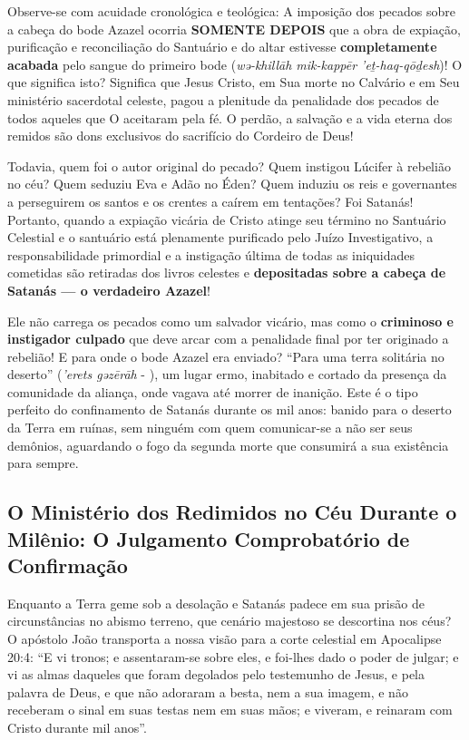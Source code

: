 \documentclass[11pt,a4paper,openany]{book}
\begin{document}
Observe-se com acuidade cronológica e teológica:
A imposição dos pecados sobre a cabeça do bode Azazel ocorria \textbf{SOMENTE DEPOIS} que a obra de expiação, purificação e reconciliação do Santuário e do altar estivesse \textbf{completamente acabada} pelo sangue do primeiro bode (\textit{wə-khillāh mik-kappēr ’eṯ-haq-qōḏesh})!
O que significa isto?
Significa que Jesus Cristo, em Sua morte no Calvário e em Seu ministério sacerdotal celeste, pagou a plenitude da penalidade dos pecados de todos aqueles que O aceitaram pela fé. O perdão, a salvação e a vida eterna dos remidos são dons exclusivos do sacrifício do Cordeiro de Deus!

Todavia, quem foi o autor original do pecado? Quem instigou Lúcifer à rebelião no céu? Quem seduziu Eva e Adão no Éden? Quem induziu os reis e governantes a perseguirem os santos e os crentes a caírem em tentações? Foi Satanás!
Portanto, quando a expiação vicária de Cristo atinge seu término no Santuário Celestial e o santuário está plenamente purificado pelo Juízo Investigativo, a responsabilidade primordial e a instigação última de todas as iniquidades cometidas são retiradas dos livros celestes e \textbf{depositadas sobre a cabeça de Satanás — o verdadeiro Azazel}!

Ele não carrega os pecados como um salvador vicário, mas como o \textbf{criminoso e instigador culpado} que deve arcar com a penalidade final por ter originado a rebelião!
E para onde o bode Azazel era enviado? ``Para uma terra solitária no deserto'' (\textit{’erets gəzērāh} - ), um lugar ermo, inabitado e cortado da presença da comunidade da aliança, onde vagava até morrer de inanição.
Este é o tipo perfeito do confinamento de Satanás durante os mil anos: banido para o deserto da Terra em ruínas, sem ninguém com quem comunicar-se a não ser seus demônios, aguardando o fogo da segunda morte que consumirá a sua existência para sempre.



\subsection{O Ministério dos Redimidos no Céu Durante o Milênio: O Julgamento Comprobatório de Confirmação}


Enquanto a Terra geme sob a desolação e Satanás padece em sua prisão de circunstâncias no abismo terreno, que cenário majestoso se descortina nos céus?
O apóstolo João transporta a nossa visão para a corte celestial em Apocalipse 20:4:
``E vi tronos; e assentaram-se sobre eles, e foi-lhes dado o poder de julgar; e vi as almas daqueles que foram degolados pelo testemunho de Jesus, e pela palavra de Deus, e que não adoraram a besta, nem a sua imagem, e não receberam o sinal em suas testas nem em suas mãos; e viveram, e reinaram com Cristo durante mil anos''.
\end{document}

